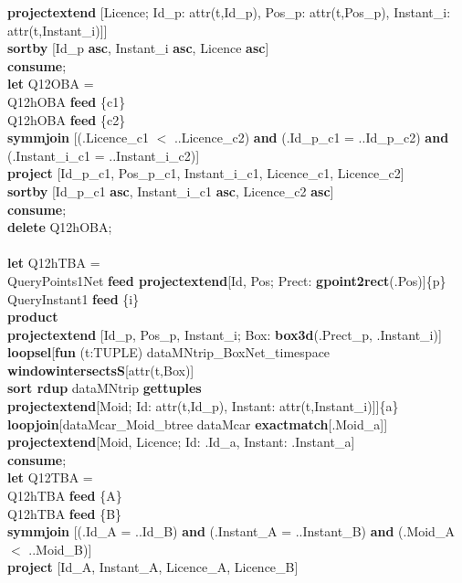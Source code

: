 \documentclass[a4paper]{article}
\newcommand{\op}[1]{\textbf{#1}}
\begin{document}
\begin{scriptsize}
\begin{tabbing}
\>\>\op{projectextend} [Licence; Id\_p: attr(t,Id\_p), Pos\_p: attr(t,Pos\_p),
Instant\_i: attr(t,Instant\_i)]]\\
\>\op{sortby} [Id\_p \op{asc}, Instant\_i \op{asc}, Licence \op{asc}]\\
\op{consume};\\
\op{let} Q12OBA =\\
\>Q12hOBA \op{feed} \{c1\}\\
\>Q12hOBA \op{feed} \{c2\}\\
\>\op{symmjoin} [(.Licence\_c1 $<$ ..Licence\_c2) \op{and} (.Id\_p\_c1 =
..Id\_p\_c2) \op{and} (.Instant\_i\_c1 = ..Instant\_i\_c2)]\\
\>\op{project} [Id\_p\_c1, Pos\_p\_c1, Instant\_i\_c1, Licence\_c1,
Licence\_c2]\\
\>\op{sortby} [Id\_p\_c1 \op{asc}, Instant\_i\_c1 \op{asc}, Licence\_c2
\op{asc}]\\
\op{consume};\\
\op{delete} Q12hOBA;\\
\\
\op{let} Q12hTBA =\\
\>QueryPoints1Net \op{feed projectextend}[Id, Pos; Prect:
\op{gpoint2rect}(.Pos)]\{p\}\\
\>QueryInstant1 \op{feed} \{i\}\\
\>\op{product}\\
\>\op{projectextend} [Id\_p, Pos\_p, Instant\_i; Box: \op{box3d}(.Prect\_p,
.Instant\_i)]\\
\>\op{loopsel}[\op{fun} (t:TUPLE) dataMNtrip\_BoxNet\_timespace
\op{windowintersectsS}[attr(t,Box)]\\
\>\>\op{sort rdup} dataMNtrip \op{gettuples}\\
\>\>\op{projectextend}[Moid; Id: attr(t,Id\_p), Instant:
attr(t,Instant\_i)]]\{a\}\\
\>\op{loopjoin}[dataMcar\_Moid\_btree dataMcar \op{exactmatch}[.Moid\_a]]\\
\>\op{projectextend}[Moid, Licence; Id: .Id\_a, Instant: .Instant\_a]\\
\op{consume};\\
\op{let} Q12TBA =\\
\>Q12hTBA \op{feed} \{A\}\\
\>Q12hTBA \op{feed} \{B\}\\
\>\op{symmjoin} [(.Id\_A = ..Id\_B) \op{and} (.Instant\_A = ..Instant\_B) \op
{and} (.Moid\_A $<$ ..Moid\_B)]\\
\>\op{project} [Id\_A, Instant\_A, Licence\_A, Licence\_B]\\

\end{tabbing}
\end{scriptsize}
\end{document}

